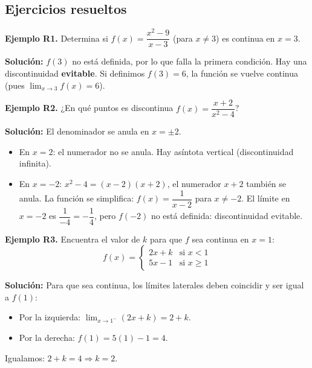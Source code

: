 \documentclass[12pt, a4paper]{article}
\begin{document}
\subsection{Ejercicios resueltos}

\textbf{Ejemplo R1.} Determina si $f(x) = \dfrac{x^2 - 9}{x - 3}$ (para $x \neq 3$) es continua en $x = 3$.

\begin{cuadrosolucion}
  \textbf{Solución:} $f(3)$ no está definida, por lo que falla la primera condición. Hay una discontinuidad \textbf{evitable}. Si definimos $f(3) = 6$, la función se vuelve continua (pues $\lim_{x \to 3} f(x) = 6$).
\end{cuadrosolucion}
\newpage
\textbf{Ejemplo R2.} ¿En qué puntos es discontinua $f(x) = \dfrac{x + 2}{x^2 - 4}$?

\begin{cuadrosolucion}
  \textbf{Solución:} El denominador se anula en $x = \pm 2$.
  \begin{itemize}
    \item En $x = 2$: el numerador no se anula. Hay asíntota vertical (discontinuidad infinita).
    \item En $x = -2$: $x^2 - 4 = (x - 2)(x + 2)$, el numerador $x + 2$ también se anula. La función se simplifica: $f(x) = \dfrac{1}{x - 2}$ para $x \neq -2$. El límite en $x = -2$ es $\dfrac{1}{-4} = -\dfrac{1}{4}$, pero $f(-2)$ no está definida: discontinuidad evitable.
  \end{itemize}
\end{cuadrosolucion}

\textbf{Ejemplo R3.} Encuentra el valor de $k$ para que $f$ sea continua en $x = 1$:
$$f(x) = \begin{cases} 2x + k & \text{si } x < 1 \\ 5x - 1 & \text{si } x \ge 1 \end{cases}$$

\begin{cuadrosolucion}
  \textbf{Solución:} Para que sea continua, los límites laterales deben coincidir y ser igual a $f(1)$:
  \begin{itemize}
    \item Por la izquierda: $\lim_{x \to 1^-} (2x + k) = 2 + k$.
    \item Por la derecha: $f(1) = 5(1) - 1 = 4$.
  \end{itemize}
  Igualamos: $2 + k = 4 \Rightarrow k = 2$.
\end{cuadrosolucion}
\end{document}
